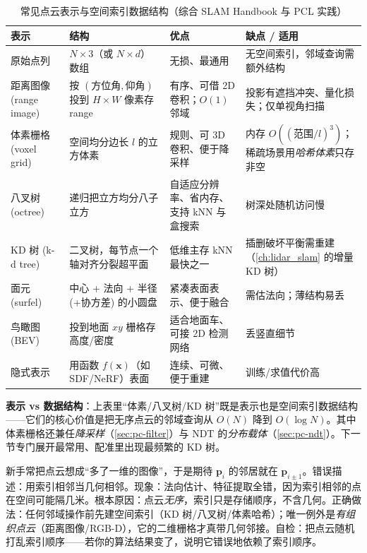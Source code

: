 \begin{table}[H]\centering\small
\caption{常见点云表示与空间索引数据结构（综合 SLAM Handbook\cite{carlone2026handbook} 与 PCL 实践）}
\label{tab:pc-representations}
\begin{tabular}{p{} p{} p{} p{}}
\toprule
表示 & 结构 & 优点 & 缺点 / 适用 \\
\midrule
原始点列 & $N\times3$（或 $N\times d$）数组 & 无损、最通用 & 无空间索引，邻域查询需额外结构 \\
距离图像 (range image) & 按 $(\text{方位角},\text{仰角})$ 投到 $H\times W$ 像素存 range & 有序、可借 2D 卷积；$O(1)$ 邻域 & 投影有遮挡冲突、量化损失；仅单视角扫描 \\
体素栅格 (voxel grid) & 空间均分边长 $l$ 的立方体素 & 规则、可 3D 卷积、便于降采样 & 内存 $O((\text{范围}/l)^3)$；稀疏场景用\emph{哈希体素}只存非空 \\
八叉树 (octree) & 递归把立方均分八子立方 & 自适应分辨率、省内存、支持 kNN 与盒搜索 & 树深处随机访问慢 \\
KD 树 (k-d tree) & 二叉树，每节点一个轴对齐分裂超平面 & 低维主存 kNN 最快之一 & 插删破坏平衡需重建（\cref{ch:lidar_slam} 的增量 KD 树） \\
面元 (surfel) & 中心 + 法向 + 半径(+协方差) 的小圆盘 & 紧凑表面表示、便于融合 & 需估法向；薄结构易丢 \\
鸟瞰图 (BEV) & 投到地面 $xy$ 栅格存高度/密度 & 适合地面车、可接 2D 检测网络 & 丢竖直细节 \\
隐式表示 & 用函数 $f(\mathbf{x})$（如 SDF/NeRF）表面 & 连续、可微、便于重建 & 训练/求值代价高 \\
\bottomrule
\end{tabular}
\end{table}

\noindent\textbf{表示 vs 数据结构}：上表里“体素/八叉树/KD 树”既是表示也是空间索引数据结构——它们的核心价值是把无序点云的邻域查询从 $O(N)$ 降到 $O(\log N)$。其中体素栅格还兼任\emph{降采样}（\cref{sec:pc-filter}）与 NDT 的\emph{分布载体}（\cref{sec:pc-ndt}）。下一节专门展开最常用、配准里出现最频繁的 KD 树。

\begin{pitfall}
新手常把点云想成“多了一维的图像”，于是期待 $\mathbf{p}_i$ 的邻居就在 $\mathbf{p}_{i\pm1}$。错误描述：用索引相邻当几何相邻。现象：法向估计、特征提取全错，因为索引相邻的点在空间可能隔几米。根本原因：点云\emph{无序}，索引只是存储顺序，不含几何。正确做法：任何邻域操作前先建空间索引（KD 树/八叉树/体素哈希）；唯一例外是\emph{有组织点云}（距离图像/RGB-D），它的二维栅格才真带几何邻接。自检：把点云随机打乱索引顺序——若你的算法结果变了，说明它错误地依赖了索引顺序。
\end{pitfall}

